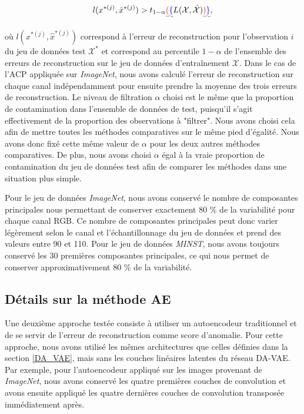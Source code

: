\begin{gather} \label{eq:anomalie_mse}
l(x^{*(j)}, \hat{x}^{*(j)}) > t_{1-\alpha}\DIFdelbegin \DIFdel{(}\DIFdelend \DIFaddbegin \DIFadd{\{}\DIFaddend L(\mathcal{X}, \hat{\mathcal{X}})\DIFdelbegin \DIFdel{)}\DIFdelend \DIFaddbegin \DIFadd{\}}\DIFaddend ,
\end{gather}

où $l(x^{*(j)}, \hat{x}^{*(j)})$ correspond à l'erreur de reconstruction pour l'observation $i$ du jeu de données test $\mathcal{X^*}$ et \DIFdelbegin {}\DIFdelend \DIFaddbegin {}\DIFaddend correspond au percentile $1-\alpha$ de l'ensemble des erreurs de reconstruction sur le jeu de données d'entraînement $\mathcal{X}$. Dans le cas de l'ACP appliquée sur \textit{ImageNet}, nous avons calculé l'erreur de reconstruction sur chaque canal indépendamment pour ensuite prendre la moyenne des trois erreurs de reconstruction. Le niveau de filtration $\alpha$ choisi est le même que la proportion de contamination dans l'ensemble de données de test, puisqu'il s'agit effectivement de la proportion des observations à "filtrer". Nous avons choisi cela afin de mettre toutes les méthodes comparatives sur le même pied d'égalité. Nous avons donc fixé cette même valeur de $\alpha$ pour les deux autres méthodes comparatives. De plus, nous avons choisi $\alpha$ égal à la vraie proportion de contamination du jeu de données test afin de comparer les méthodes dans une situation plus simple.

Pour le jeu de données \textit{ImageNet}, nous avons conservé le nombre de composantes principales nous permettant de conserver exactement 80 \% de la variabilité pour chaque canal RGB. Ce nombre de composantes principales peut donc varier légèrement selon le canal et l'échantillonnage du jeu de données et prend des valeurs entre 90 et 110. Pour le jeu de données \textit{MINST}, nous avons toujours conservé les 30 premières composantes principales, ce qui nous permet de conserver approximativement  80 \% de la variabilité. 

\subsection{Détails sur la méthode AE} \label{AE}

Une deuxième approche testée consiste à utiliser un autoencodeur traditionnel et de se servir de l'erreur de reconstruction comme score d'anomalie. Pour cette approche, nous avons utilisé les mêmes architectures que celles définies dans la section \ref{DA_VAE}, mais sans les couches linéaires latentes du réseau DA-VAE. Par exemple, pour l'autoencodeur appliqué sur les images provenant de \textit{ImageNet}, nous avons conservé les quatre premières couches de convolution et avons ensuite appliqué les quatre dernières couches de convolution transposée immédiatement après.

